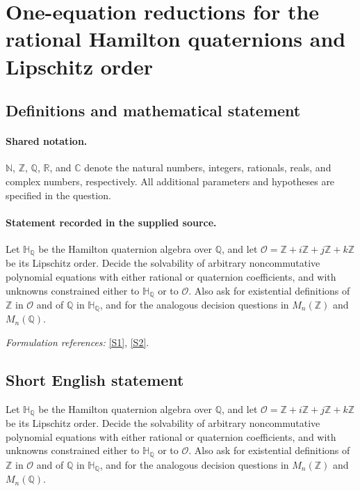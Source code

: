 \documentclass[11pt]{article}
\newcommand{\sref}[2]{\hyperlink{source:#1:#2}{[S#2]}}
\begin{document}
\section{One-equation reductions for the rational Hamilton quaternions and Lipschitz order}\label{statement}

\subsection{Definitions and mathematical statement}

\paragraph{Shared notation.}$\mathbb N$, $\mathbb Z$, $\mathbb Q$, $\mathbb R$, and $\mathbb C$ denote the natural numbers, integers, rationals, reals, and complex numbers, respectively. All additional parameters and hypotheses are specified in the question.


\paragraph{Statement recorded in the supplied source.}
Let $\mathbb H_{\mathbb Q}$ be the Hamilton quaternion algebra over $\mathbb Q$, and let $\mathcal O=\mathbb Z+i\mathbb Z+j\mathbb Z+k\mathbb Z$ be its Lipschitz order. Decide the solvability of arbitrary noncommutative polynomial equations with either rational or quaternion coefficients, and with unknowns constrained either to $\mathbb H_{\mathbb Q}$ or to $\mathcal O$. Also ask for existential definitions of $\mathbb Z$ in $\mathcal O$ and of $\mathbb Q$ in $\mathbb H_{\mathbb Q}$, and for the analogous decision questions in $M_n(\mathbb Z)$ and $M_n(\mathbb Q)$.
\par\smallskip\textit{Formulation references:} \sref{statement}{1}, \sref{statement}{2}.
\subsection{Short English statement}
Let $\mathbb H_{\mathbb Q}$ be the Hamilton quaternion algebra over $\mathbb Q$, and let $\mathcal O=\mathbb Z+i\mathbb Z+j\mathbb Z+k\mathbb Z$ be its Lipschitz order. Decide the solvability of arbitrary noncommutative polynomial equations with either rational or quaternion coefficients, and with unknowns constrained either to $\mathbb H_{\mathbb Q}$ or to $\mathcal O$. Also ask for existential definitions of $\mathbb Z$ in $\mathcal O$ and of $\mathbb Q$ in $\mathbb H_{\mathbb Q}$, and for the analogous decision questions in $M_n(\mathbb Z)$ and $M_n(\mathbb Q)$.
\end{document}
